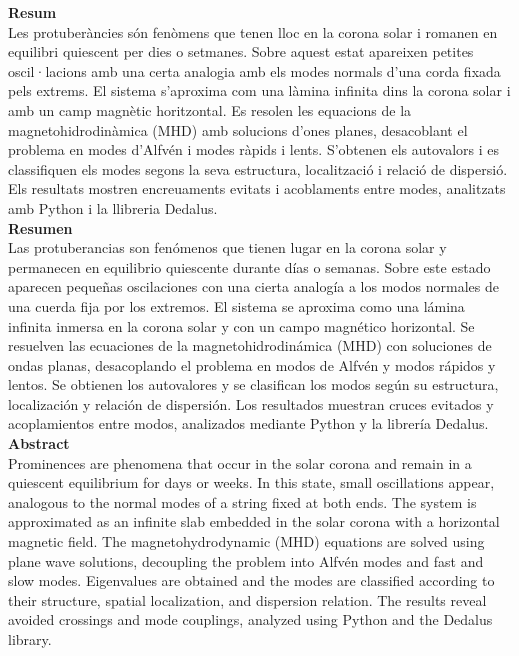 \thispagestyle{footer}
\newpage
\thispagestyle{empty}
\mbox{}
\newpage
{\selectfont
     \noindent\Large{\sffamily\textbf{Resum}}\\
     
    \normalsize{Les protuberàncies són fenòmens que tenen lloc en la corona solar i romanen en equilibri quiescent per dies o setmanes.
    Sobre aquest estat apareixen petites oscil·lacions amb una certa analogia amb els modes normals d'una corda fixada pels extrems.
    El sistema s'aproxima com una làmina infinita dins la corona solar i amb un camp magnètic horitzontal.
    Es resolen les equacions de la magnetohidrodinàmica (MHD) amb solucions d'ones planes, desacoblant el problema en modes d'Alfvén i modes ràpids i lents.
    S'obtenen els autovalors i es classifiquen els modes segons la seva estructura, localització i relació de dispersió.
    Els resultats mostren encreuaments evitats i acoblaments entre modes, analitzats amb Python i la llibreria Dedalus.} \\
    
    \noindent\Large{\sffamily\textbf{Resumen}}\\

    
    \normalsize{Las protuberancias son fenómenos que tienen lugar en la corona solar y permanecen en equilibrio quiescente durante días o semanas.
    Sobre este estado aparecen pequeñas oscilaciones con una cierta analogía a los modos normales de una cuerda fija por los extremos.
    El sistema se aproxima como una lámina infinita inmersa en la corona solar y con un campo magnético horizontal.
    Se resuelven las ecuaciones de la magnetohidrodinámica (MHD) con soluciones de ondas planas, desacoplando el problema en modos de Alfvén y modos rápidos y lentos.
    Se obtienen los autovalores y se clasifican los modos según su estructura, localización y relación de dispersión.
    Los resultados muestran cruces evitados y acoplamientos entre modos, analizados mediante Python y la librería Dedalus.} \\
    
    \noindent\Large{\sffamily\textbf{Abstract}}\\

    
    \normalsize{Prominences are phenomena that occur in the solar corona and remain in a quiescent equilibrium for days or weeks.
    In this state, small oscillations appear, analogous to the normal modes of a string fixed at both ends.
    The system is approximated as an infinite slab embedded in the solar corona with a horizontal magnetic field.
    The magnetohydrodynamic (MHD) equations are solved using plane wave solutions, decoupling the problem into Alfvén modes and fast and slow modes.
    Eigenvalues are obtained and the modes are classified according to their structure, spatial localization, and dispersion relation.
    The results reveal avoided crossings and mode couplings, analyzed using Python and the Dedalus library.}\\

}
